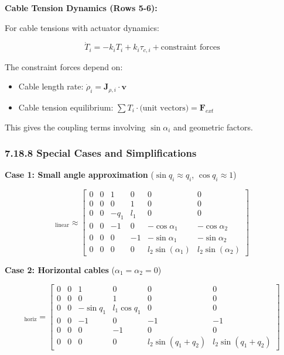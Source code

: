 \textbf{Cable Tension Dynamics (Rows 5-6):}

For cable tensions with actuator dynamics:

\begin{equation}
\dot{T}_i = -k_i T_i + k_i \tau_{c,i} + \text{constraint forces}
\end{equation}

The constraint forces depend on:
\begin{itemize}
    \item Cable length rate: $\dot{\rho}_i = \mathbf{J}_{\rho,i} \cdot \mathbf{v}$
    \item Cable tension equilibrium: $\sum T_i \cdot \text{(unit vectors)} = \mathbf{F}_{ext}$
\end{itemize}

This gives the coupling terms involving $\sin \alpha_i$ and geometric factors.

\subsubsection{7.18.8 Special Cases and Simplifications}

\textbf{Case 1: Small angle approximation} ($\sin q_i \approx q_i$, $\cos q_i \approx 1$)

\begin{equation}
[A]_{\text{linear}} \approx \begin{bmatrix}
0 & 0 & 1 & 0 & 0 & 0 \\
0 & 0 & 0 & 1 & 0 & 0 \\
0 & 0 & -q_1 & l_1 & 0 & 0 \\
0 & 0 & -1 & 0 & -\cos \alpha_1 & -\cos \alpha_2 \\
0 & 0 & 0 & -1 & -\sin \alpha_1 & -\sin \alpha_2 \\
0 & 0 & 0 & 0 & l_2 \sin(\alpha_1) & l_2 \sin(\alpha_2)
\end{bmatrix}
\end{equation}

\textbf{Case 2: Horizontal cables} ($\alpha_1 = \alpha_2 = 0$)

\begin{equation}
[A]_{\text{horiz}} = \begin{bmatrix}
0 & 0 & 1 & 0 & 0 & 0 \\
0 & 0 & 0 & 1 & 0 & 0 \\
0 & 0 & -\sin q_1 & l_1 \cos q_1 & 0 & 0 \\
0 & 0 & -1 & 0 & -1 & -1 \\
0 & 0 & 0 & -1 & 0 & 0 \\
0 & 0 & 0 & 0 & l_2 \sin(q_1+q_2) & l_2 \sin(q_1+q_2)
\end{bmatrix}
\end{equation}

